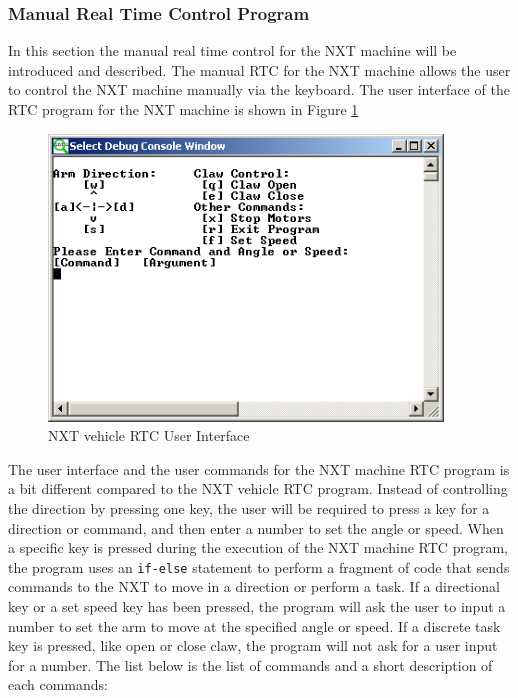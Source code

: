 \documentclass[11pt]{article}
\begin{document}
\subsubsection{Manual Real Time Control Program}
In this section the manual real time control for the NXT machine will be 
introduced and described. The manual RTC for the NXT machine allows the user to 
control the NXT machine manually via the keyboard. The user interface of the RTC 
program for the NXT machine is shown in Figure \ref{fig_mach_UI}
\begin{figure}[H]
  \begin{center}
    \includegraphics[height=3in]{figure/mindstorm/mach_UI.png}
    \caption{NXT vehicle RTC User Interface \label{fig_mach_UI}}
  \end{center}
\end{figure}
The user interface and the user commands for the NXT machine RTC program is a 
bit different compared to the NXT vehicle RTC program. Instead of controlling 
the direction by pressing one key, the user will be required to press a key for 
a direction or command, and then enter a number to set the angle or speed. When 
a specific key is pressed during the execution of the NXT machine RTC program, 
the program uses an {\tt if-else} statement to perform a fragment of code that 
sends commands to the NXT to move in a direction or perform a task. If a 
directional key or a set speed key has been pressed, the program will ask the
user to input a number to set the arm to move at the specified angle or speed. 
If a discrete task key is pressed, like open or close claw, the program will 
not ask for a user input for a number. The list below is the list of commands 
and a short description of each commands:
\end{document}
